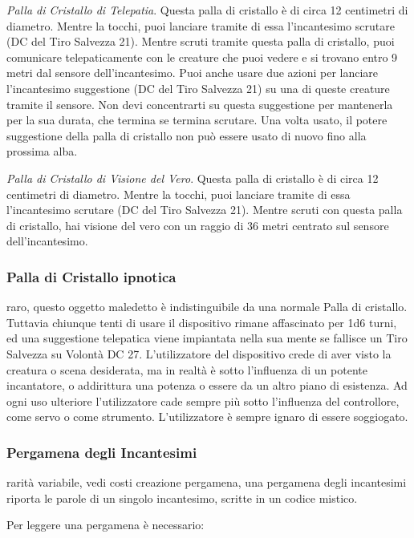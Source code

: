 \begin{multicols}{2}
	\textit{Palla di Cristallo di Telepatia}. Questa palla di cristallo è di circa 12 centimetri di diametro. Mentre la tocchi, puoi lanciare tramite di essa l'incantesimo scrutare (DC del Tiro Salvezza 21). Mentre scruti tramite questa palla di cristallo, puoi comunicare telepaticamente con le creature che puoi vedere e si trovano entro 9 metri dal sensore dell'incantesimo. Puoi anche usare due azioni per lanciare l'incantesimo suggestione (DC del Tiro Salvezza 21) su una di queste creature tramite il sensore. Non devi concentrarti su questa suggestione per mantenerla per la sua durata, che termina se termina scrutare. Una volta usato, il potere suggestione della palla di cristallo non può essere usato di nuovo fino alla prossima alba.

	\textit{Palla di Cristallo di Visione del Vero}. Questa palla di cristallo è di circa 12 centimetri di diametro. Mentre la tocchi, puoi lanciare tramite di essa l'incantesimo scrutare (DC del Tiro Salvezza 21). Mentre scruti con questa palla di cristallo, hai visione del vero con un raggio di 36 metri centrato sul sensore dell'incantesimo.

	\subsubsection*{Palla di Cristallo ipnotica}
	raro, questo oggetto maledetto è indistinguibile da una normale Palla di cristallo. Tuttavia chiunque tenti di usare il dispositivo rimane affascinato per 1d6 turni, ed una suggestione telepatica viene impiantata nella sua mente se fallisce un Tiro Salvezza su Volontà DC 27. L'utilizzatore del dispositivo crede di aver visto la creatura o scena desiderata, ma in realtà è sotto l'influenza di un potente incantatore, o addirittura una potenza o essere da un altro piano di esistenza. Ad ogni uso ulteriore l'utilizzatore cade sempre più sotto l’influenza del controllore, come servo o come strumento. L'utilizzatore è sempre ignaro di essere soggiogato.

	\subsubsection*{Pergamena degli Incantesimi}
	rarità variabile, vedi costi creazione pergamena, una pergamena degli incantesimi riporta le parole di un singolo incantesimo, scritte in un codice mistico.

	Per leggere una pergamena è necessario:


\end{multicols}
